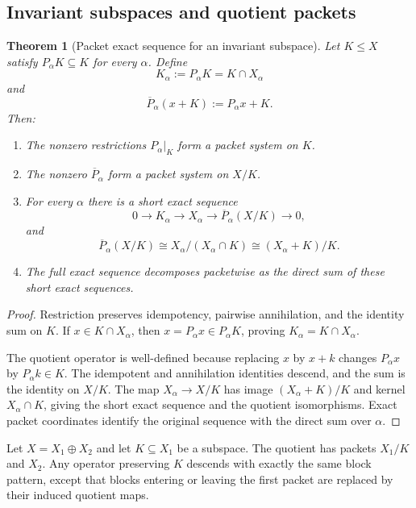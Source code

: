 \documentclass[11pt]{article}
\newtheorem{theorem}{Theorem}[section]
\theoremstyle{definition}
\theoremstyle{remark}
\theoremstyle{definition}\newtheorem{example}[theorem]{Example}
\newcommand{\RecordID}[1]{\label{record:#1}}
\newcommand{\Depends}[1]{}
\newcommand{\Exports}[1]{}
\begin{document}
\subsection{Invariant subspaces and quotient packets}
\begin{theorem}[Packet exact sequence for an invariant subspace]
\label{thm:packet-exact-sequence}
Let $K\leq X$ satisfy $P_\alpha K\subseteq K$ for every $\alpha$.  Define
\[
K_\alpha:=P_\alpha K=K\cap X_\alpha
\]
and
\[
\overline P_\alpha(x+K):=P_\alpha x+K.
\]
Then:
\begin{enumerate}[label=(\roman*)]
\item The nonzero restrictions $P_\alpha|_K$ form a packet system on $K$.
\item The nonzero $\overline P_\alpha$ form a packet system on $X/K$.
\item For every $\alpha$ there is a short exact sequence
\[
0\longrightarrow K_\alpha
\longrightarrow X_\alpha
\longrightarrow \overline P_\alpha(X/K)
\longrightarrow0,
\]
and
\[
\overline P_\alpha(X/K)
\cong
X_\alpha/(X_\alpha\cap K)
\cong
(X_\alpha+K)/K.
\]
\item The full exact sequence decomposes packetwise as the direct sum of these short exact sequences.
\end{enumerate}
\end{theorem}
\RecordID{PSC-I-T-PACKET-EXACT-SEQUENCE}
\Depends{PSC-I-T-EXACT-PACKET-COORDINATES.}
\Exports{Packetwise subobject and quotient constructions.}

\begin{proof}
Restriction preserves idempotency, pairwise annihilation, and the identity sum on $K$.  If $x\in K\cap X_\alpha$, then $x=P_\alpha x\in P_\alpha K$, proving $K_\alpha=K\cap X_\alpha$.

The quotient operator is well-defined because replacing $x$ by $x+k$ changes $P_\alpha x$ by $P_\alpha k\in K$.  The idempotent and annihilation identities descend, and the sum is the identity on $X/K$.  The map $X_\alpha\to X/K$ has image $(X_\alpha+K)/K$ and kernel $X_\alpha\cap K$, giving the short exact sequence and the quotient isomorphisms.  Exact packet coordinates identify the original sequence with the direct sum over $\alpha$.
\end{proof}

\begin{microexample}[title={Packet descent to a quotient}]
Let \(X=X_1\oplus X_2\) and let \(K\subseteq X_1\) be a subspace.  The quotient has packets \(X_1/K\) and \(X_2\).  Any operator preserving \(K\) descends with exactly the same block pattern, except that blocks entering or leaving the first packet are replaced by their induced quotient maps.
\end{microexample}
\end{document}
